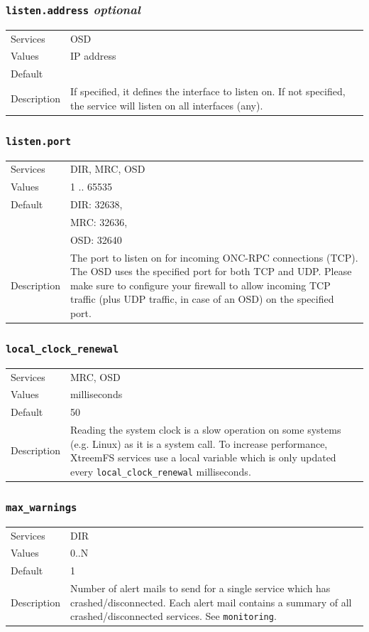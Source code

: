 \documentclass[a4paper,10pt]{book}
\begin{document}
\subsubsection{\texttt{listen.address} \textit{optional}}
\begin{tabular}{lp{10cm}}
 Services & OSD\\
 Values   & IP address \\
 Default  & \\
 Description & If specified, it defines the interface to listen on. If not specified, the service will listen on all interfaces (any).
\end{tabular}

\subsubsection{\texttt{listen.port}}
\begin{tabular}{lp{10cm}}
 Services & DIR, MRC, OSD\\
 Values   & 1 .. 65535 \\
 Default  & DIR: 32638,\\
 & MRC: 32636,\\
 & OSD: 32640 \\
 Description & The port to listen on for incoming ONC-RPC connections (TCP). The OSD uses the specified port for both TCP and UDP. Please make sure to configure your firewall to allow incoming TCP traffic (plus UDP traffic, in case of an OSD) on the specified port.
\end{tabular}

\subsubsection{\texttt{local\_clock\_renewal}}
\begin{tabular}{lp{10cm}}
 Services & MRC, OSD\\
 Values   & milliseconds \\
 Default  & 50\\
 Description & Reading the system clock is a slow operation on some systems (e.g. Linux) as it is a system call. To increase performance, XtreemFS services use a local variable which is only updated every \texttt{local\_clock\_renewal} milliseconds.
\end{tabular}

\subsubsection{\texttt{max\_warnings}}
\begin{tabular}{lp{10cm}}
 Services & DIR\\
 Values   & 0..N \\
 Default  & 1\\
 Description & Number of alert mails to send for a single service which has crashed/disconnected. Each alert mail contains a summary of all crashed/disconnected services. See \texttt{monitoring}.
\end{tabular}
\end{document}
